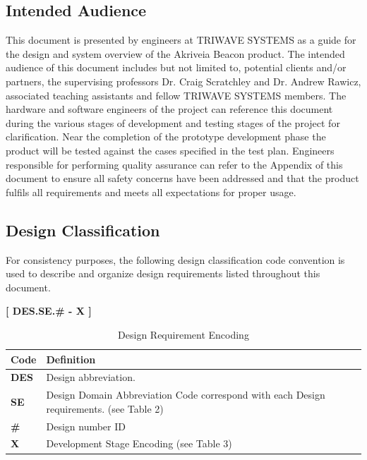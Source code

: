\subsection{Intended Audience}

\medskip
This document is presented by engineers at TRIWAVE SYSTEMS as a guide for the design and system overview of the Akriveia Beacon product. The intended audience of this document includes but not limited to, potential clients and/or partners, the supervising professors Dr. Craig Scratchley and Dr. Andrew Rawicz, associated teaching assistants and fellow TRIWAVE SYSTEMS members. The hardware and software engineers of the project can reference this document during the various stages of development and testing stages of the project for clarification. Near the completion of the prototype development phase the product will be tested against the cases specified in the test plan. Engineers responsible for performing quality assurance can refer to the Appendix of this document to ensure all safety concerns have been addressed and that the product fulfils all requirements and meets all expectations for proper usage. 

\break
\subsection{Design  Classification}
For consistency purposes, the following design classification code convention is used to describe and organize design requirements listed throughout this document. 
\medskip
\begin{center}
	\textbf{[ DES.SE.\# - X ]} 
\end{center}

\bgroup
\def\arraystretch{1.5}
\begin{table}[H]
\centering
\begin{tabular}{ | m{1cm} | m{13cm}| } 
\hline
\rowcolor{lightgray} \textbf{Code} & \textbf{Definition} \\ 
\hline
 \textbf{DES} & Design abbreviation. \\ 
\hline
 \textbf{SE} & Design Domain Abbreviation Code correspond with each Design requirements. (see Table 2)\\   
\hline
 \textbf{\#} & Design number ID \\ 
\hline
 \textbf{X} & Development Stage Encoding (see Table 3)\\ 
\hline
\end{tabular}
\caption{Design Requirement Encoding}
\end{table}

